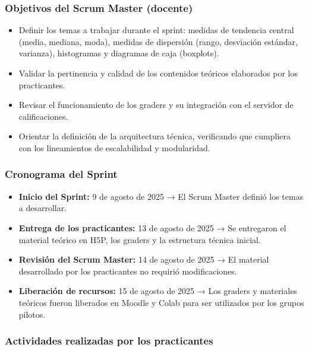 \documentclass[letter,oneside,12pt,spanish]{report}
\begin{document}
\subsubsection*{Objetivos del Scrum Master (docente)}
\begin{itemize}
	\item Definir los temas a trabajar durante el sprint: medidas de tendencia central (media, mediana, moda), medidas de dispersión (rango, desviación estándar, varianza), histogramas y diagramas de caja (boxplots).
	\item Validar la pertinencia y calidad de los contenidos teóricos elaborados por los practicantes.
	\item Revisar el funcionamiento de los graders y su integración con el servidor de calificaciones.
	\item Orientar la definición de la arquitectura técnica, verificando que cumpliera con los lineamientos de escalabilidad y modularidad.
\end{itemize}

\subsubsection*{Cronograma del Sprint}
\begin{itemize}
	\item \textbf{Inicio del Sprint:} 9 de agosto de 2025 → El Scrum Master definió los temas a desarrollar.
	\item \textbf{Entrega de los practicantes:} 13 de agosto de 2025 → Se entregaron el material teórico en H5P, los graders y la estructura técnica inicial.
	\item \textbf{Revisión del Scrum Master:} 14 de agosto de 2025 → El material desarrollado por los practicantes no requirió modificaciones.
	\item \textbf{Liberación de recursos:} 15 de agosto de 2025 → Los graders y materiales teóricos fueron liberados en Moodle y Colab para ser utilizados por los grupos pilotos.
\end{itemize}

\subsubsection*{Actividades realizadas por los practicantes}
\end{document}
